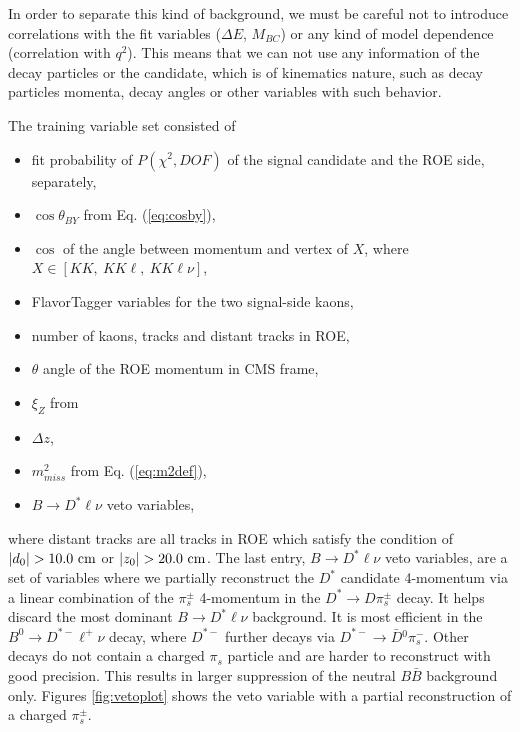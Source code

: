 In order to separate this kind of background, we must be careful not to introduce correlations with the fit variables ($\Delta E$, $M_{BC}$) or any kind of model dependence (correlation with $q^2$). This means that we can not use any information of the decay particles or the candidate, which is of kinematics nature, such as decay particles momenta, decay angles or other variables with such behavior.

The training variable set consisted of
\begin{itemize}
\item fit probability of $P(\chi^2,DOF)$ of the signal candidate and the ROE side, separately,
\item $\cos\theta_{BY}$ from Eq. (\ref{eq:cosby}),
\item $\cos$ of the angle between momentum and vertex of $X$, where $X \in [KK,~KK\ell,~KK\ell\nu]$,
\item FlavorTagger variables for the two signal-side kaons,
\item number of kaons, tracks and distant tracks in ROE,
\item $\theta$ angle of the ROE momentum in CMS frame,
\item $\xi_Z$ from \cite{PhysRevD.83.032007}
\item $\Delta z$,
\item $m_{miss}^2$ from Eq. (\ref{eq:m2def}),
\item $B \to D^* \ell \nu$ veto variables,
\end{itemize}
where distant tracks are all tracks in ROE which satisfy the condition of $\vert d_0 \vert  > 10.0\mathrm{~cm}$ or $\vert z_0 \vert > 20.0\mathrm{~cm}$. The last entry, $B \to D^* \ell \nu$ veto variables, are a set of variables where we partially reconstruct the $D^*$ candidate 4-momentum via a linear combination of the $\pi^\pm_s$ 4-momentum in the $D^* \to D \pi_s^\pm$ decay. It helps discard the most dominant $B \to D^* \ell \nu$ background. It is most efficient in the $B^0 \to D^{*-} \ell^+ \nu$ decay, where $D^{*-}$ further decays via $D^{*-} \to \bar D {}^0 \pi^-_s$. Other decays do not contain a charged $\pi_s$ particle and are harder to reconstruct with good precision. This results in larger suppression of the neutral $B \bar B$ background only. Figures \ref{fig:vetoplot} shows the veto variable with a partial reconstruction of a charged $\pi_s^\pm$.

